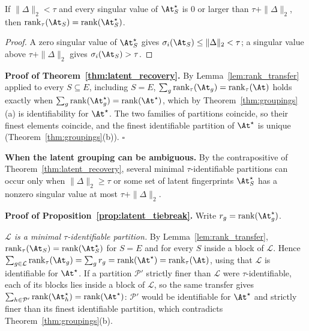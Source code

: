 \begin{lemma}
\label{lem:rank_transfer}
If \(\|\Delta\|_2<\tau\) and every singular value of \(\At^\star_S\) is \(0\) or larger
than \(\tau+\|\Delta\|_2\), then \(\operatorname{rank}_\tau(\At_S)=\operatorname{rank}(\At^\star_S)\).
\end{lemma}

\begin{proof}
A zero singular value of \(\At^\star_S\) gives \(\sigma_i(\At_S)\le\|\Delta\|_2<\tau\); a
singular value above \(\tau+\|\Delta\|_2\) gives \(\sigma_i(\At_S)>\tau\).
\end{proof}

\noindent\textbf{Proof of Theorem~\ref{thm:latent_recovery}.}
By Lemma~\ref{lem:rank_transfer} applied to every \(S\subseteq E\), including \(S=E\),
\(\sum_g\operatorname{rank}_\tau(\At_g)=\operatorname{rank}_\tau(\At)\) holds exactly when
\(\sum_g\operatorname{rank}(\At^\star_g)=\operatorname{rank}(\At^\star)\), which by
Theorem~\ref{thm:groupings}(a) is identifiability for \(\At^\star\).  The two families of
partitions coincide, so their finest elements coincide, and the finest identifiable
partition of \(\At^\star\) is unique (Theorem~\ref{thm:groupings}(b)).  \(\square\)

\noindent\textbf{When the latent grouping can be ambiguous.}  By the contrapositive of
Theorem~\ref{thm:latent_recovery}, several minimal \(\tau\)-identifiable partitions can
occur only when \(\|\Delta\|_2\ge\tau\) or some set of latent fingerprints \(\At^\star_S\)
has a nonzero singular value at most \(\tau+\|\Delta\|_2\).

\noindent\textbf{Proof of Proposition~\ref{prop:latent_tiebreak}.}
Write \(r_g=\operatorname{rank}(\At^\star_g)\).

\emph{\(\mathcal L\) is a minimal \(\tau\)-identifiable partition.}  By
Lemma~\ref{lem:rank_transfer}, \(\operatorname{rank}_\tau(\At_S)=\operatorname{rank}(\At^\star_S)\)
for \(S=E\) and for every \(S\) inside a block of \(\mathcal L\).  Hence
\(\sum_{g\in\mathcal L}\operatorname{rank}_\tau(\At_g)=\sum_g r_g=\operatorname{rank}(\At^\star)
=\operatorname{rank}_\tau(\At)\), using that \(\mathcal L\) is identifiable for
\(\At^\star\).  If a partition \(\mathcal P'\) strictly finer than \(\mathcal L\) were
\(\tau\)-identifiable, each of its blocks lies inside a block of \(\mathcal L\), so the
same transfer gives \(\sum_{h\in\mathcal P'}\operatorname{rank}(\At^\star_h)=
\operatorname{rank}(\At^\star)\): \(\mathcal P'\) would be identifiable for
\(\At^\star\) and strictly finer than its finest identifiable partition, which
contradicts Theorem~\ref{thm:groupings}(b).

